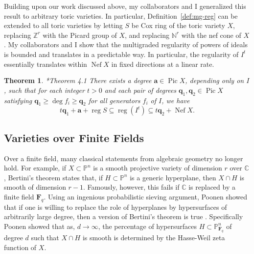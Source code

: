 \documentclass[11pt,reqno]{amsart}
\newtheorem{theorem}[lemma]{Theorem}
\theoremstyle{remark}
\newcommand{\reg}{\operatorname{reg}}
\newcommand{\Pic}{\operatorname{Pic}}
\newcommand{\Nef}{\operatorname{Nef}}
\renewcommand{\aa}{\mathbf a}
\newcommand{\qq}{\mathbf q}
\newcommand{\fF}{\mathbf F}
\newcommand{\C}{\mathbb{C}}
\newcommand{\N}{\mathbb{N}}
\renewcommand{\P}{\mathbb{P}}
\newcommand{\Z}{\mathbb{Z}}
\newcommand{\juliette}[1]{{\color{red} \sf $\spadesuit\spadesuit\spadesuit$ Juliette: [#1]}}
\begin{document}
Building upon our work discussed above, my collaborators and I generalized this result to arbitrary toric varieties. In particular, Definition~\ref{def:mg-reg} can be extended to all toric varieties by letting $S$ be Cox ring of the toric variety $X$, replacing $\Z^r$ with the Picard group of $X$, and replacing $\N^{r}$ with the nef cone of $X$. My collaborators and I show that the multigraded regularity of powers of ideals is bounded and translates in a predictable way. In particular, the regularity of $I^{t}$ essentially translates within $\Nef X$ in fixed directions at a linear rate.


 

\begin{theorem}\cite{bruceHellerSayrafi22}*{Theorem 4.1}
  There exists a degree $\aa\in\Pic X$, depending only on $I$, such that for each integer $t>0$ and each pair of degrees $\qq_1,\qq_2\in\Pic X$ satisfying $\qq_1\geq\deg f_i\geq\qq_2$ for all generators $f_i$ of $I$, we have
	\[ t\qq_1+\aa+\reg S \subseteq \reg\!\left(I^t\right) \subseteq t\qq_2+\Nef X. \]
\end{theorem}


\subsection{Varieties over Finite Fields}

Over a finite field, many classical statements from algebraic geometry no longer hold. For example, if $X\subset\P^n$ is a smooth projective variety of dimension $r$ over $\C$, Bertini's theorem states that, if $H\subset \P^n$ is a generic hyperplane, then $X\cap H$ is smooth of dimension $r-1$. Famously, however, this fails if $\C$ is replaced by a finite field $\fF_{q}$. Using an ingenious probabilistic sieving argument, Poonen showed that if one is willing to replace the role of hyperplanes by hypersurfaces of arbitrarily large degree, then a version of Bertini's theorem is true \cite{poonen04}. Specifically Poonen showed that as, $d\to\infty$, the percentage of hypersurfaces $H\subset \P_{\fF_{q}}^{n}$ of degree $d$ such that $X\cap H$ is smooth is determined by the Hasse-Weil zeta function of $X$.
\end{document}

